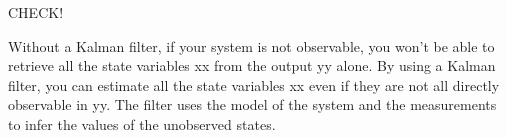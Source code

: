 CHECK! 

Without a Kalman filter, if your system is not observable, you won't be able to retrieve all the state variables xx from the output yy alone.
By using a Kalman filter, you can estimate all the state variables xx even if they are not all directly observable in yy. The filter uses the 
model of the system and the measurements to infer the values of the unobserved states.





































